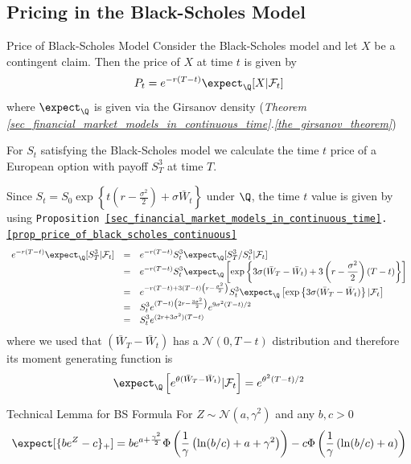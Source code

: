 \documentclass[11pt,a4paper]{article}
\begin{document}
\subsection{Pricing in the Black-Scholes Model}

  \begin{proposition}{Price of Black-Scholes Model}\label{prop_price_of_black_scholes_continuous}
    Consider the Black-Scholes model and let $X$ be a contingent claim. Then the price of $X$ at time $t$ is given by
    \[ P_t=e^{-r(T-t)}\expect_\Q[X|\mathcal{F}_t] \]
    where $\expect_\Q$ is given via the Girsanov density (\textit{Theorem \ref{sec_financial_market_models_in_continuous_time}.\ref{the_girsanov_theorem}})
  \end{proposition}

  \begin{example}{}
    For $S_t$ satisfying the Black-Scholes model we calculate the time $t$ price of a European option with payoff $S_T^3$ at time $T$.
    \par Since $S_t=S_0\exp\left\{t\left(r-\frac{\sigma^2}2\right)+\sigma\bar{W}_t\right\}$ under $\Q$, the time $t$ value is given by using \texttt{Proposition \ref{sec_financial_market_models_in_continuous_time}.\ref{prop_price_of_black_scholes_continuous}}
    \[\everymath={\displaystyle}\begin{array}{rcl}
      e^{-r(T-t)}\expect_\Q[S_T^3|\mathcal{F}_t]&=&e^{-r(T-t)}S_t^3\expect_\Q[S_T^3/S_t^3|\mathcal{F}_t]\\
      &=&e^{-r(T-t)}S_t^3\expect_\Q\left[\exp\left\{3\sigma(\bar{W}_T-\bar{W}_t)+3\left(r-\frac{\sigma^2}2\right)(T-t)\right\}\right]\\
      &=&e^{-r(T-t)+3(T-t)\left(r-\frac{\sigma^2}2\right)}S_t^3\expect_\Q\left[\exp\left\{3\sigma(\bar{W}_T-\bar{W}_t)\right\}|\mathcal{F}_t\right]\\
      &=&S_t^3e^{(T-t)\left(2r-\frac{3\sigma^2}2\right)}e^{9\sigma^2(T-t)/2}\\
      &=&S_t^3e^{(2r+3\sigma^2)(T-t)}
    \end{array}\]
    where we used that $(\bar{W}_T-\bar{W}_t)$ has a $\mathcal{N}(0,T-t)$ distribution and therefore its moment generating function is
    \[ \expect_\Q\left[e^{\theta(\bar{W}_T-\bar{W}_t)}|\mathcal{F}_t\right]=e^{\theta^2(T-t)/2} \]
  \end{example}

  \begin{theorem}{Technical Lemma for BS Formula}\label{the_technical_lemma_for_BS}
    For $Z\sim\mathcal{N}(a,\gamma^2)$ and any $b,c>0$
    \[ \expect[\{be^Z-c\}_+]=be^{a+\frac{\gamma^2}2}\Phi\left(\frac1\gamma\left(\ln(b/c)+a+\gamma^2\right)\right)-c\Phi\left(\frac1\gamma\left(\ln(b/c)+a\right)\right) \]
  \end{theorem}
\end{document}
